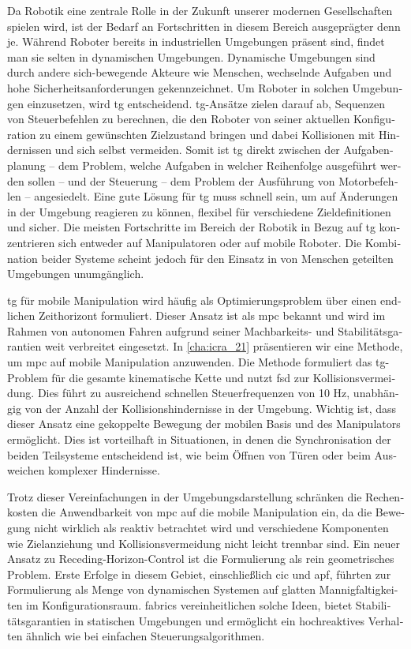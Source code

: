 \acresetall
\begin{otherlanguage}{german}
Da Robotik eine zentrale Rolle in der Zukunft unserer modernen Gesellschaften
spielen wird, ist der Bedarf an Fortschritten in diesem Bereich ausgeprägter
denn je. Während Roboter bereits in industriellen Umgebungen präsent sind,
findet man sie selten in dynamischen Umgebungen. Dynamische Umgebungen sind
durch andere sich-bewegende Akteure wie Menschen, wechselnde Aufgaben und hohe
Sicherheitsanforderungen gekennzeichnet. Um Roboter in solchen Umgebungen
einzusetzen, wird \ac{tg} entscheidend. \Ac{tg}-Ansätze zielen darauf ab,
Sequenzen von Steuerbefehlen zu berechnen, die den Roboter von seiner aktuellen
Konfiguration zu einem gewünschten Zielzustand bringen und dabei Kollisionen mit
Hindernissen und sich selbst vermeiden. Somit ist \ac{tg} direkt zwischen der
Aufgabenplanung – dem Problem, welche Aufgaben in welcher Reihenfolge ausgeführt
werden sollen – und der Steuerung – dem Problem der Ausführung von Motorbefehlen
– angesiedelt. Eine gute Lösung für \ac{tg} muss schnell sein, um auf Änderungen
in der Umgebung reagieren zu können, flexibel für verschiedene Zieldefinitionen
und sicher. Die meisten Fortschritte im Bereich der Robotik in
Bezug auf \ac{tg} konzentrieren sich entweder auf Manipulatoren oder auf mobile
Roboter. Die Kombination beider Systeme scheint jedoch für den Einsatz in von
Menschen geteilten Umgebungen unumgänglich.

\Ac{tg} für mobile Manipulation wird häufig als Optimierungsproblem über
einen endlichen Zeithorizont formuliert. Dieser Ansatz ist als \ac{mpc} bekannt
und wird im Rahmen von autonomen Fahren aufgrund seiner Machbarkeits- und
Stabilitätsgarantien weit verbreitet eingesetzt. In \cref{cha:icra_21}
präsentieren wir eine Methode, um \ac{mpc} auf mobile Manipulation anzuwenden.
Die Methode formuliert das \ac{tg}-Problem für die gesamte kinematische Kette
und nutzt \ac{fsd} zur Kollisionsvermeidung. Dies führt zu ausreichend schnellen
Steuerfrequenzen von 10 Hz, unabhängig von der Anzahl der Kollisionshindernisse
in der Umgebung. Wichtig ist, dass dieser Ansatz eine gekoppelte Bewegung der
mobilen Basis und des Manipulators ermöglicht. Dies ist vorteilhaft in
Situationen, in denen die Synchronisation der beiden Teilsysteme entscheidend
ist, wie beim Öffnen von Türen oder beim Ausweichen komplexer Hindernisse.

Trotz dieser Vereinfachungen in der Umgebungsdarstellung schränken die
Rechenkosten die Anwendbarkeit von \ac{mpc} auf die mobile Manipulation ein, da
die Bewegung nicht wirklich als reaktiv betrachtet wird und verschiedene Komponenten
wie Zielanziehung und Kollisionsvermeidung nicht leicht trennbar sind. Ein neuer
Ansatz zu Receding-Horizon-Control ist die Formulierung als rein
geometrisches Problem. Erste Erfolge in diesem Gebiet, einschließlich \ac{cic}
und \ac{apf}, führten zur Formulierung als Menge von dynamischen Systemen auf
glatten Mannigfaltigkeiten im Konfigurationsraum. \Ac{fabrics}
vereinheitlichen solche Ideen, bietet Stabilitätsgarantien in statischen
Umgebungen und ermöglicht ein hochreaktives Verhalten ähnlich wie bei einfachen
Steuerungsalgorithmen.


\end{otherlanguage}
